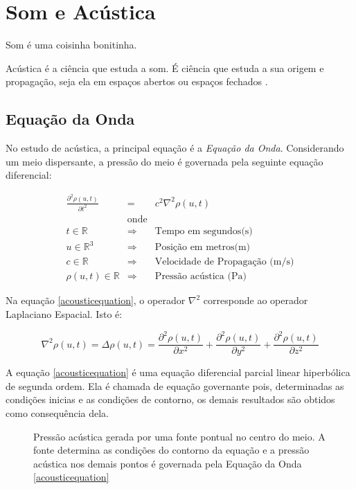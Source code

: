 \section{Som e Acústica}

Som é uma coisinha bonitinha.

Acústica é a ciência que estuda a som. É ciência que estuda a sua origem e propagação, seja ela em espaços abertos ou espaços fechados \cite{kuttruff2007acoustics}.

\subsection{Equação da Onda}

No estudo de acústica, a principal equação é a \emph{Equação da Onda}. Considerando um meio dispersante, a pressão do meio é governada pela seguinte equação diferencial:

\begin{eqnarray}
\frac{\partial^2 \rho(u, t)}{\partial t^2} &=& c^2 \nabla^2 \rho(u, t)\label{acousticequation} \\
&\text{onde}&\nonumber\\
t \in \mathbb{R} &\Rightarrow& \text{Tempo em segundos(s)} \nonumber\\
u \in \mathbb{R}^3 &\Rightarrow& \text{Posição em metros(m)} \nonumber\\
c \in \mathbb{R} &\Rightarrow& \text{Velocidade de Propagação (m/s)} \nonumber\\
\rho(u, t) \in \mathbb{R} &\Rightarrow& \text{Pressão acústica (Pa)} \nonumber
\end{eqnarray}

Na equação \eqref{acousticequation}, o operador $\nabla^2$ corresponde ao operador Laplaciano Espacial. Isto é:

\begin{equation}
	\nabla^2 \rho(u, t) = \Delta \rho(u, t) = \frac{\partial^2 \rho(u, t)}{\partial x^2} + \frac{\partial^2 \rho(u, t)}{\partial y^2} + \frac{\partial^2 \rho(u, t)}{\partial z^2}
\end{equation}

A equação \eqref{acousticequation} é uma equação diferencial parcial linear hiperbólica de segunda ordem. Ela é chamada de equação governante pois, determinadas as condições inicias e as condições de contorno, os demais resultados são obtidos como consequência dela.

\begin{figure}[ht]
	\centering
	
	\caption[Pressão acústica gerada uma fonte pontual]{Pressão acústica gerada por uma fonte pontual no centro do meio. A fonte determina as condições do contorno da equação e a pressão acústica nos demais pontos é governada pela Equação da Onda \eqref{acousticequation}}\label{wavefield}
\end{figure}


